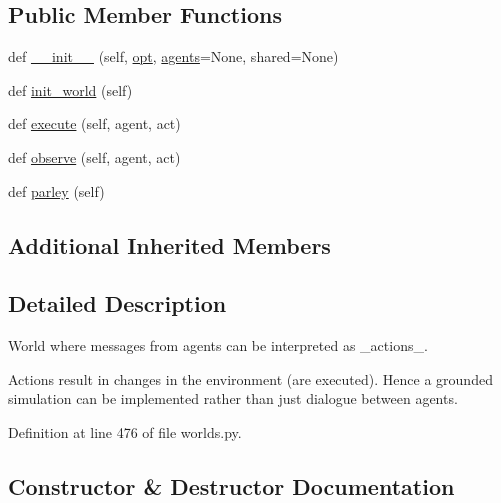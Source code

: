 \subsection*{Public Member Functions}
\begin{DoxyCompactItemize}
\item 
def \hyperlink{classparlai_1_1core_1_1worlds_1_1ExecutableWorld_a53d0974884562c0c2f92727dcc5a811b}{\+\_\+\+\_\+init\+\_\+\+\_\+} (self, \hyperlink{classparlai_1_1core_1_1worlds_1_1World_a3640d92718acd3e6942a28c1ab3678bd}{opt}, \hyperlink{classparlai_1_1core_1_1worlds_1_1MultiAgentDialogWorld_a05fc93525cb86edef121980fc55f9926}{agents}=None, shared=None)
\item 
def \hyperlink{classparlai_1_1core_1_1worlds_1_1ExecutableWorld_a8bb31ec1d93a94cb261f89ce0992159a}{init\+\_\+world} (self)
\item 
def \hyperlink{classparlai_1_1core_1_1worlds_1_1ExecutableWorld_a318fbf7c75178f62a6d46647f1a063fa}{execute} (self, agent, act)
\item 
def \hyperlink{classparlai_1_1core_1_1worlds_1_1ExecutableWorld_a69934ec2181a8b22269e02ab8b3bb1f2}{observe} (self, agent, act)
\item 
def \hyperlink{classparlai_1_1core_1_1worlds_1_1ExecutableWorld_a6555592d2b7c316e72febc1fccf43bdb}{parley} (self)
\end{DoxyCompactItemize}
\subsection*{Additional Inherited Members}


\subsection{Detailed Description}
\begin{DoxyVerb}World where messages from agents can be interpreted as _actions_.

Actions result in changes in the environment (are executed). Hence a grounded
simulation can be implemented rather than just dialogue between agents.
\end{DoxyVerb}
 

Definition at line 476 of file worlds.\+py.



\subsection{Constructor \& Destructor Documentation}
\mbox{\label{classparlai_1_1core_1_1worlds_1_1ExecutableWorld_a53d0974884562c0c2f92727dcc5a811b}} 
